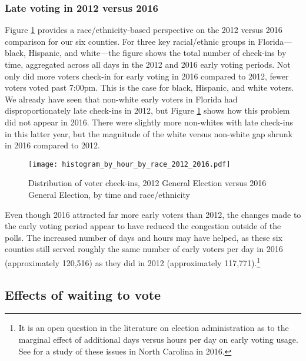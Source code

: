 \documentclass[12pt,titlepage]{article}
\begin{document}
\subsubsection*{Late voting in 2012 versus 2016}

Figure \ref{fig:race2012and2016} provides a race/ethnicity-based
perspective on the 2012 versus 2016 comparison for our six counties.
For three key racial/ethnic groups in Florida---black, Hispanic, and
white---the figure shows the total number of check-ins by time,
aggregated across all days in the 2012 and 2016 early voting periods.
Not only did more voters check-in for early voting in 2016 compared to
2012, fewer voters voted past 7:00pm. This is the case for black,
Hispanic, and white voters. We already have seen that non-white early
voters in Florida had disproportionately late check-ins in 2012, but
Figure \ref{fig:race2012and2016} shows how this problem did not appear
in 2016. There were slightly more non-whites with late check-ins in
this latter year, but the magnitude of the white versus non-white gap
shrunk in 2016 compared to 2012.

\begin{figure}[!ht]
  \caption{Distribution of voter check-ins, 2012 General Election
    versus 2016 General Election, by time and race/ethnicity}
  \label{fig:race2012and2016}
  \centering
  \centering\texttt{[image: histogram\_by\_hour\_by\_race\_2012\_2016.pdf]}
\end{figure}

Even though 2016 attracted far more early voters than 2012, the
changes made to the early voting period appear to have reduced the
congestion outside of the polls. The increased number of days and
hours may have helped, as these six counties still served roughly the
same number of early voters per day in 2016 (approximately 120,516) as
they did in 2012 (approximately 117,771).\footnote{It is an open
  question in the literature on election administration as to the
  marginal effect of additional days versus hours per day on early
  voting usage.  See \citet{walkeretal:ncearly} for a study of these
  issues in North Carolina in 2016.}



\subsection*{Effects of waiting to vote}
\end{document}
